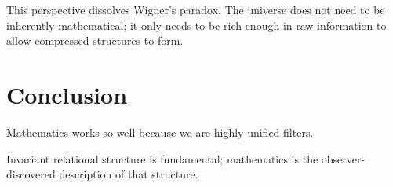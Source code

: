 This perspective dissolves Wigner's paradox. The universe does not need to be inherently mathematical; it only needs to be rich enough in raw information to allow compressed structures to form.

\section{Conclusion}

Mathematics works so well because we are highly unified filters.

Invariant relational structure is fundamental; mathematics is the observer-discovered description of that structure.
